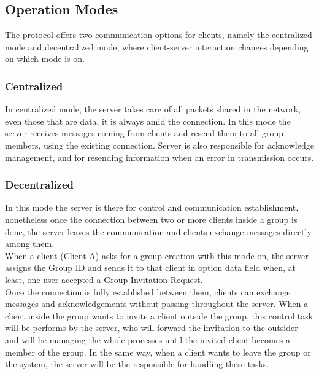 \documentclass{article}
\begin{document}
\subsection{Operation Modes}

The protocol offers two communication options for clients, namely the centralized mode and decentralized mode, where client-server interaction changes depending on which mode is on.

\subsubsection{Centralized}

In centralized mode, the server takes care of all packets shared in the network, even those that are data, it is always amid the connection. In this mode the server receives messages coming from clients and resend them to all group members, using the existing connection. Server is also responsible for acknowledge management, and for resending information when an error in transmission occurs.

\subsubsection{Decentralized}

In this mode the server is there for control and communication establishment, nonetheless once the connection between two or more clients inside a group is done, the server leaves the communication and clients exchange messages directly among them.\\

When a client (Client A) asks for a group creation with this mode on, the server assigns the Group ID and sends it to that client in option data field when, at least, one user accepted a Group Invitation Request.\\

Once the connection is fully established between them, clients can exchange messages and acknowledgements without passing throughout the server. When a client inside the group wants to invite a client outside the group, this control task will be performs by the server, who will forward the invitation to the outsider and will be managing the whole processes until the invited client becomes a member of the group. In the same way, when a client wants to leave the group or the system, the server will be the responsible for handling these tasks.\\
\end{document}
